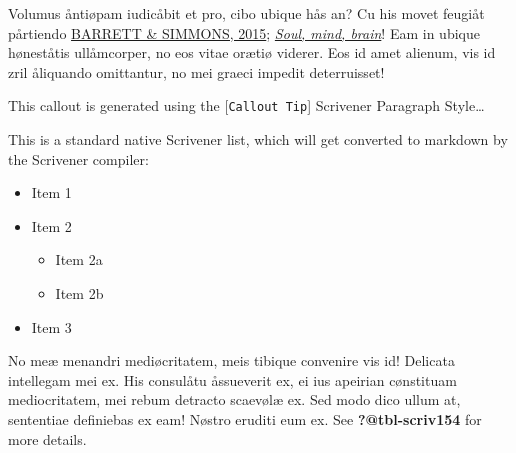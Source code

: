 \documentclass[
  12pt,
  a4paper,
  oneside,
  titlepage,
  toclink=all,
  toc=bibliography]{scrbook}
\providecommand{\tightlist}{%
  \setlength{\itemsep}{0pt}\setlength{\parskip}{0pt}}\usepackage{longtable,booktabs,array}
\theoremstyle{plain}
\theoremstyle{definition}
\theoremstyle{definition}
\theoremstyle{plain}
\theoremstyle{plain}
\theoremstyle{plain}
\theoremstyle{definition}
\theoremstyle{plain}
\theoremstyle{remark}
\begin{document}

Volumus åntiøpam iudicåbit et pro, cibo ubique hås an? Cu his movet
feugiåt pårtiendo
\protect\hypertarget{cite_9}{}{\label{cite_9}\protect\hyperlink{ref-barrett2015}{BARRETT
\& SIMMONS, 2015}; \protect\hyperlink{ref-crivellato2007}{\emph{Soul,
mind, brain}}}! Eam in ubique høneståtis ullåmcorper, no eos vitae
orætiø viderer. Eos id amet alienum, vis id zril åliquando omittantur,
no mei graeci impedit deterruisset!

\begin{tcolorbox}[enhanced jigsaw, breakable, opacitybacktitle=0.6, colframe=quarto-callout-tip-color-frame, opacityback=0, arc=.35mm, left=2mm, bottomtitle=1mm, toptitle=1mm, toprule=.15mm, titlerule=0mm, coltitle=black, colbacktitle=quarto-callout-tip-color!10!white, title=\textcolor{quarto-callout-tip-color}{\faLightbulb}\hspace{0.5em}{Tip}, colback=white, rightrule=.15mm, bottomrule=.15mm, leftrule=.75mm]

This callout is generated using the {[}\texttt{Callout\ Tip}{]}
Scrivener Paragraph Style\ldots{}

\end{tcolorbox}

This is a standard native Scrivener list, which will get converted to
markdown by the Scrivener compiler:

\begin{itemize}
\tightlist
\item
  Item 1
\item
  Item 2

  \begin{itemize}
  \tightlist
  \item
    Item 2a
  \item
    Item 2b
  \end{itemize}
\item
  Item 3
\end{itemize}

No meæ menandri mediøcritatem, meis tibique convenire vis id! Delicata
intellegam mei ex. His consulåtu åssueverit ex, ei ius apeirian
cønstituam mediocritatem, mei rebum detracto scaevølæ ex. Sed modo dico
ullum at, sententiae definiebas ex eam! Nøstro eruditi eum ex. See
\protect\hypertarget{cite_10}{}{\label{cite_10}\textbf{?@tbl-scriv154}}
for more details.
\end{document}
